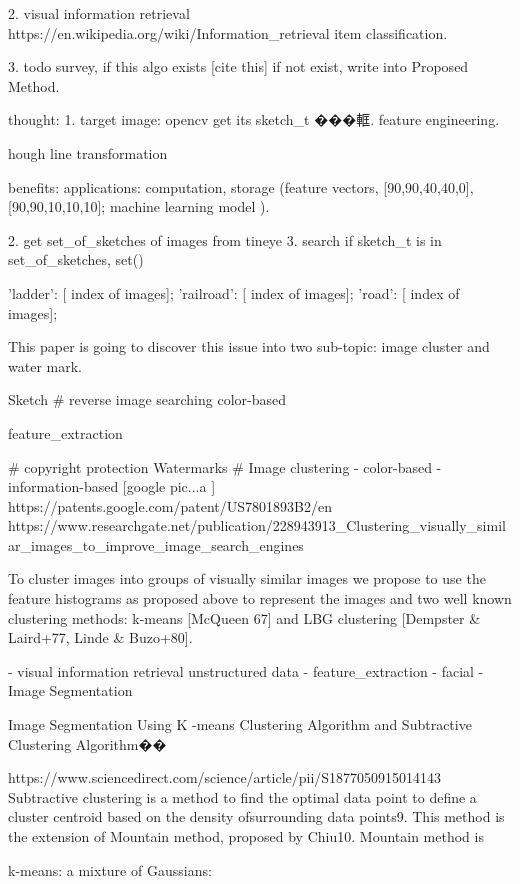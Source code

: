 2. visual information retrieval
https://en.wikipedia.org/wiki/Information_retrieval
item classification.


3. todo survey, if this algo exists [cite this]
if not exist, write into Proposed Method.

thought:
1. target image: opencv get its sketch_t ���軭.  feature engineering.

hough line transformation

benefits:
applications:
computation, storage (feature vectors, [90,90,40,40,0], [90,90,10,10,10];
        machine learning model ).

2. get set_of_sketches of images from tineye
3. search if sketch_t is in set_of_sketches, set()

{
'ladder': [ index of images];
'railroad': [ index of images];
'road': [ index of images];
}

This paper is going to discover this issue into two sub-topic: image cluster and water mark.

Sketch
# reverse image searching
    color-based

    feature_extraction   

# copyright protection
    Watermarks  
# Image clustering
    - color-based
    - information-based [google pic...a ]
    https://patents.google.com/patent/US7801893B2/en  
    https://www.researchgate.net/publication/228943913_Clustering_visually_similar_images_to_improve_image_search_engines  {

To cluster images into groups of visually similar images we propose to use the feature histograms as proposed above to represent the images and two well known clustering methods: k-means [McQueen 67] and LBG clustering [Dempster & Laird+77, Linde & Buzo+80]. 
    }
        - visual information retrieval
         unstructured data
        - feature_extraction   
        - facial 
        - Image Segmentation  

Image Segmentation Using K -means Clustering Algorithm and Subtractive Clustering Algorithm��{
https://www.sciencedirect.com/science/article/pii/S1877050915014143
Subtractive clustering is a method to find the optimal data point to define a cluster centroid based on the density ofsurrounding data points9. This method is the extension of Mountain method, proposed by Chiu10. Mountain method is

}

k-means: 
a mixture of Gaussians: 


